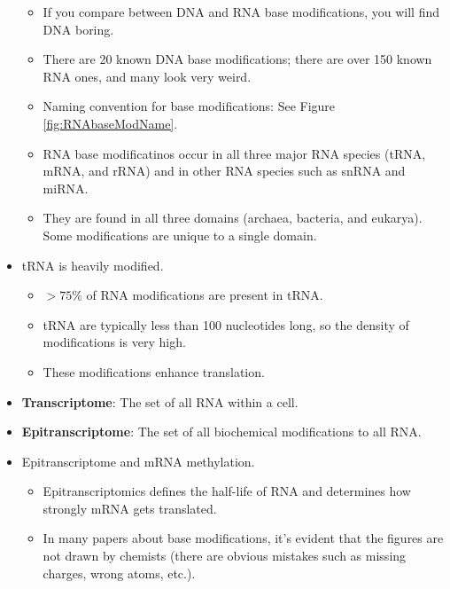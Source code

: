 \documentclass[../notes.tex]{subfiles}
\begin{document}
\begin{itemize}
\begin{figure}[h!]
    \end{figure}
    \begin{itemize}
        \item If you compare between DNA and RNA base modifications, you will find DNA boring.
        \item There are 20 known DNA base modifications; there are over 150 known RNA ones, and many look very weird.
        \item Naming convention for base modifications: See Figure \ref{fig:RNAbaseModName}.
        \item RNA base modificatinos occur in all three major RNA species (tRNA, mRNA, and rRNA) and in other RNA species such as snRNA and miRNA.
        \item They are found in all three domains (archaea, bacteria, and eukarya). Some modifications are unique to a single domain.
    \end{itemize}
    \item tRNA is heavily modified.
    \begin{itemize}
        \item $>75\%$ of RNA modifications are present in tRNA.
        \item tRNA are typically less than 100 nucleotides long, so the density of modifications is very high.
        \item These modifications enhance translation.
    \end{itemize}
    \item \textbf{Transcriptome}: The set of all RNA within a cell.
    \item \textbf{Epitranscriptome}: The set of all biochemical modifications to all RNA.
    \item Epitranscriptome and mRNA methylation.
    \begin{itemize}
        \item Epitranscriptomics defines the half-life of RNA and determines how strongly mRNA gets translated.
        \item In many papers about base modifications, it's evident that the figures are not drawn by chemists (there are obvious mistakes such as missing charges, wrong atoms, etc.).
    \end{itemize}
\end{itemize}
\end{document}
